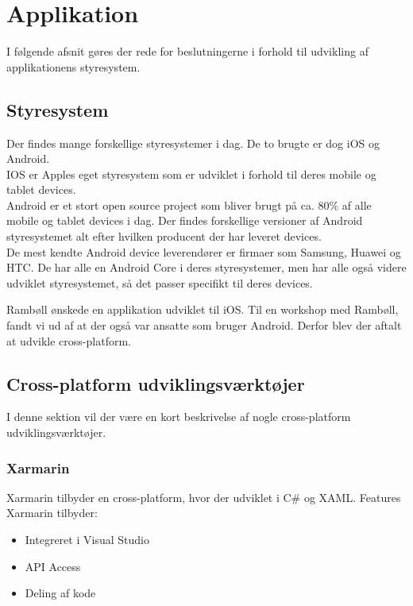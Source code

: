 \section{Applikation}                                   
I følgende afsnit gøres der rede for beslutningerne i forhold til udvikling af applikationens styresystem.

\subsection{Styresystem}
Der findes mange forskellige styresystemer i dag. De to brugte er dog iOS \cite{iOS} og Android. \cite{Android} \\
IOS er Apples eget styresystem som er udviklet i forhold til deres mobile og tablet devices. \\
Android er et stort open source project som bliver brugt på ca. 80\% af alle mobile og tablet devices i dag. Der findes forskellige versioner af Android styresystemet alt efter hvilken producent der har leveret devices. \\
De mest kendte Android device leverendører er firmaer som Samsung, Huawei og HTC. De har alle en Android Core i deres styresystemer, men har alle også videre udviklet styresystemet, så det passer specifikt til deres devices.

Rambøll ønskede en applikation udviklet til iOS. Til en workshop med Rambøll, fandt vi ud af at der også var ansatte som bruger Android. Derfor blev der aftalt at udvikle cross-platform. \\

\subsection{Cross-platform udviklingsværktøjer}
I denne sektion vil der være en kort beskrivelse af nogle cross-platform udviklingsværktøjer.

\subsubsection{Xarmarin}
Xarmarin tilbyder en cross-platform, hvor der udviklet i C\#\cite{CSharp} og XAML\cite{XAML}.
Features Xarmarin tilbyder:
\begin{itemize}[-]
	\item Integreret i Visual Studio
	\item API Access 
	\item Deling af kode
\end{itemize}

